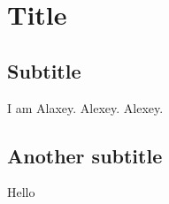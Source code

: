 \documentclass{article}
\begin{document}
\section{Title}

\subsection{Subtitle}
I am Alaxey. Alexey. Alexey.
\subsection{Another subtitle}

Hello
\end{document}
